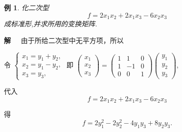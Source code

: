 \documentclass[13pt]{beamer}
\newtheorem{exa}{例}
\def\sol{{\bf 解~~ }}
\begin{document}
\begin{frame}
\begin{exa}
 化二次型
\[
f=2 x_{1} x_{2}+2 x_{1} x_{3}-6 x_{2} x_{3}
\]
成标准形,并求所用的变换矩阵. 
\end{exa}
\sol 由于所给二次型中无平方项，所以

令 $\left\{\begin{array}{l}x_{1}=y_{1}+y_{2}, \\ x_{2}=y_{1}-y_{2}, \\ x_{3}=y_{3}, \end{array}\right.$\quad 
 即  
	$\left(
	\begin{array}{l}
	x_{1} \\ x_{2} \\ x_{3}
	\end{array}\right)
	=\left(\begin{array}{ccc}1 & 1 & 0 \\ 1 & -1 & 0 \\ 0 & 0 & 1\end{array}\right)
	\left(\begin{array}{l}y_{1} \\ y_{2} \\ y_{3}\end{array}\right)$,

代入 $$f=2 x_{1} x_{2}+2 x_{1} x_{3}-6 x_{2} x_{3}$$

得 $$f=2 y_{1}^{2}-2 y_{2}^{2}-4 y_{1} y_{3}+8 y_{2} y_{3}.$$

\end{frame}
\end{document}

